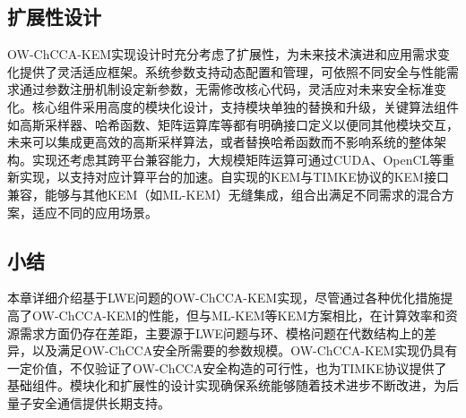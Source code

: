\subsection{扩展性设计}

OW-ChCCA-KEM实现设计时充分考虑了扩展性，为未来技术演进和应用需求变化提供了灵活适应框架。系统参数支持动态配置和管理，可依照不同安全与性能需求通过参数注册机制设定新参数，无需修改核心代码，灵活应对未来安全标准变化。核心组件采用高度的模块化设计，支持模块单独的替换和升级，关键算法组件如高斯采样器、哈希函数、矩阵运算库等都有明确接口定义以便同其他模块交互，未来可以集成更高效的高斯采样算法，或者替换哈希函数而不影响系统的整体架构。实现还考虑其跨平台兼容能力，大规模矩阵运算可通过CUDA、OpenCL等重新实现，以支持对应计算平台的加速。自实现的KEM与TIMKE协议的KEM接口兼容，能够与其他KEM（如ML-KEM）无缝集成，组合出满足不同需求的混合方案，适应不同的应用场景。

\subsection{小结}

本章详细介绍基于LWE问题的OW-ChCCA-KEM实现，尽管通过各种优化措施提高了OW-ChCCA-KEM的性能，但与ML-KEM等KEM方案相比，在计算效率和资源需求方面仍存在差距，主要源于LWE问题与环、模格问题在代数结构上的差异，以及满足OW-ChCCA安全所需要的参数规模。OW-ChCCA-KEM实现仍具有一定价值，不仅验证了OW-ChCCA安全构造的可行性，也为TIMKE协议提供了基础组件。模块化和扩展性的设计实现确保系统能够随着技术进步不断改进，为后量子安全通信提供长期支持。
